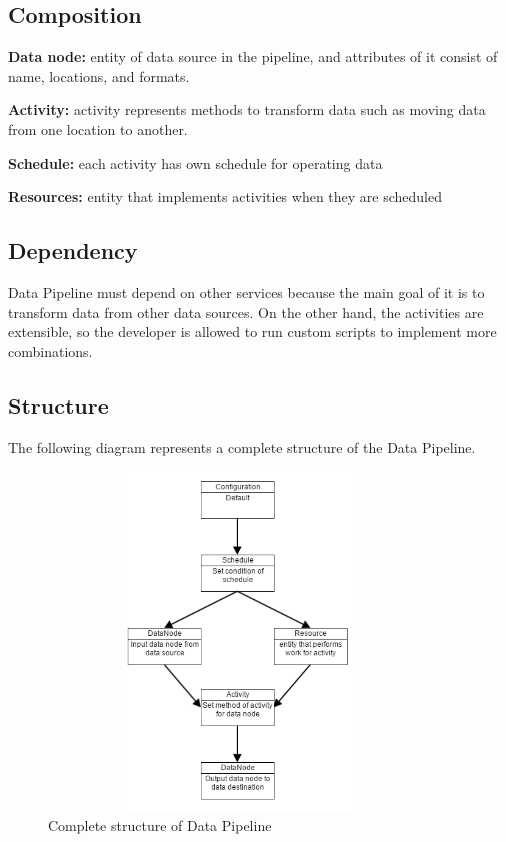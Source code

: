      \subsection{Composition}
     \textbf{Data node:} entity of data source in the pipeline, and attributes of it consist of name, locations, and formats\cite{z5}. 
     
     \noindent\textbf{Activity:} activity represents methods to transform data such as moving data from one location to another. 
     
     \noindent\textbf{Schedule:} each activity has own schedule for operating data
     
     \noindent\textbf{Resources:} entity that implements activities when they are scheduled 
     
	\subsection{Dependency}
     Data Pipeline must depend on other services because the main goal of it is to transform data from other data sources. On the other hand, the activities are extensible, so the developer is allowed to run custom scripts to implement more combinations.
     
    	\subsection{Structure}
The following diagram represents a complete structure of the Data Pipeline. 
    \begin{figure}[h]
        \includegraphics[width=10cm, height=9cm]{data_pipeline.png}
        \centering
        \caption{Complete structure of Data Pipeline}
    \end{figure}
    
